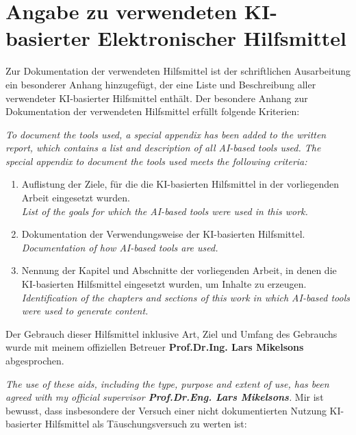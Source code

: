 \chapter*{Angabe zu verwendeten KI-basierter Elektronischer Hilfsmittel}

Zur Dokumentation der verwendeten Hilfsmittel ist der schriftlichen Ausarbeitung ein besonderer Anhang hinzugefügt, der eine Liste und Beschreibung aller verwendeter KI-basierter Hilfsmittel enthält. Der besondere Anhang zur Dokumentation der verwendeten Hilfsmittel erfüllt folgende Kriterien:

\emph{\small\color{dkfzgray2} To document the tools used, a special appendix has been added to the written report, which contains a list and description of all AI-based tools used. The special appendix to document the tools used meets the following criteria:}

\begin{enumerate}
    \item Auflistung der Ziele, für die die KI-basierten Hilfsmittel in der vorliegenden Arbeit eingesetzt wurden.\\
    \emph{\small\color{dkfzgray2} List of the goals for which the AI-based tools were used in this work.}
    \item Dokumentation der Verwendungsweise der KI-basierten Hilfsmittel.\\
    \emph{\small\color{dkfzgray2} Documentation of how AI-based tools are used.}
    \item Nennung der Kapitel und Abschnitte der vorliegenden Arbeit, in denen die KI-basierten Hilfsmittel eingesetzt wurden, um Inhalte zu erzeugen.\\
    \emph{\small\color{dkfzgray2} Identification of the chapters and sections of this work in which AI-based tools were used to generate content.}
\end{enumerate}

Der Gebrauch dieser Hilfsmittel inklusive Art, Ziel und Umfang des Gebrauchs wurde mit meinem offiziellen Betreuer \textbf{Prof.Dr.Ing. Lars Mikelsons} abgesprochen.

\emph{\small\color{dkfzgray2} The use of these aids, including the type, purpose and extent of use, has been agreed with my official supervisor \textbf{Prof.Dr.Eng. Lars Mikelsons}.}
\newpage
Mir ist bewusst, dass insbesondere der Versuch einer nicht dokumentierten Nutzung KI- basierter Hilfsmittel als Täuschungsversuch zu werten ist:

